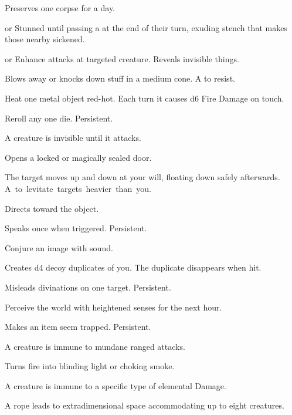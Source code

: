 \documentclass[itdr]{subfiles}
\begin{document}
\begin{enumerate}
	\item {} Preserves one corpse for a day.
	\item {}  or Stunned until passing a   at the end of their turn, exuding stench that makes those nearby sickened.
	\item {}  or Enhance attacks at targeted creature. Reveals invisible things.
	\item {} Blows away or knocks down stuff in a medium cone. A  to resist.
	\item {} Heat one metal object red-hot. Each turn it causes d6 Fire Damage on touch.
	\item {} Reroll any one die. Persistent.
	\begin{minipage}{\columnwidth}
	\item {} A creature is invisible until it attacks.
	\end{minipage}
	\item {} Opens a locked or magically sealed door.
	\item {} The target moves up and down at your will, floating down safely afterwards. \mbox{A  to levitate targets heavier than you.}
	\item {} Directs toward the object.
	\item {} Speaks once when triggered. Persistent.
	\item {} Conjure an image with sound.
	\item {} Creates d4 decoy duplicates of you. The duplicate disappears when hit.
	\item {} Misleads divinations on one \mbox{target}. Persistent.
	\item {} Perceive the world with heightened senses for the next hour.
	\item {} Makes an item seem trapped. Persistent.
	\item {} A creature is immune to mundane ranged attacks.
	\item {} Turns fire into blinding light or choking smoke.
	\item {} A creature is immune to a specific type of elemental Damage.
	\item {} A rope leads to extradimensional space accommodating up to eight creatures.

\end{enumerate}
\end{document}
